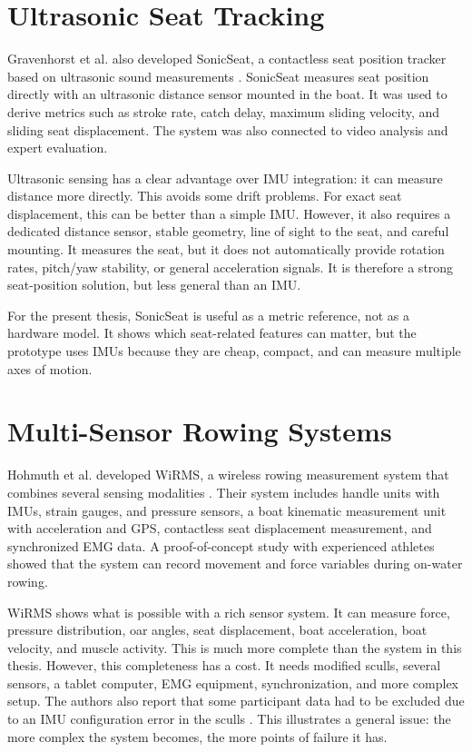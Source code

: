 \section{Ultrasonic Seat Tracking}

Gravenhorst et al. also developed SonicSeat, a contactless seat position tracker based on ultrasonic sound measurements \cite{gravenhorst_sonicseat_2012}. SonicSeat measures seat position directly with an ultrasonic distance sensor mounted in the boat. It was used to derive metrics such as stroke rate, catch delay, maximum sliding velocity, and sliding seat displacement. The system was also connected to video analysis and expert evaluation.

Ultrasonic sensing has a clear advantage over IMU integration: it can measure distance more directly. This avoids some drift problems. For exact seat displacement, this can be better than a simple IMU. However, it also requires a dedicated distance sensor, stable geometry, line of sight to the seat, and careful mounting. It measures the seat, but it does not automatically provide rotation rates, pitch/yaw stability, or general acceleration signals. It is therefore a strong seat-position solution, but less general than an IMU.

For the present thesis, SonicSeat is useful as a metric reference, not as a hardware model. It shows which seat-related features can matter, but the prototype uses IMUs because they are cheap, compact, and can measure multiple axes of motion.

\section{Multi-Sensor Rowing Systems}

Hohmuth et al. developed WiRMS, a wireless rowing measurement system that combines several sensing modalities \cite{hohmuth_wireless_2023}. Their system includes handle units with IMUs, strain gauges, and pressure sensors, a boat kinematic measurement unit with acceleration and GPS, contactless seat displacement measurement, and synchronized EMG data. A proof-of-concept study with experienced athletes showed that the system can record movement and force variables during on-water rowing.

WiRMS shows what is possible with a rich sensor system. It can measure force, pressure distribution, oar angles, seat displacement, boat acceleration, boat velocity, and muscle activity. This is much more complete than the system in this thesis. However, this completeness has a cost. It needs modified sculls, several sensors, a tablet computer, EMG equipment, synchronization, and more complex setup. The authors also report that some participant data had to be excluded due to an IMU configuration error in the sculls \cite{hohmuth_wireless_2023}. This illustrates a general issue: the more complex the system becomes, the more points of failure it has.

